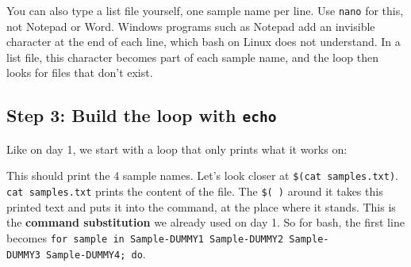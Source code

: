 \documentclass[
  letterpaper,
  DIV=11,
  numbers=noendperiod]{scrreprt}
\newenvironment{Shaded}{}{}
\newcommand{\BuiltInTok}[1]{\textcolor[rgb]{0.84,0.23,0.29}{#1}}
\newcommand{\ControlFlowTok}[1]{\textcolor[rgb]{0.84,0.23,0.29}{#1}}
\newcommand{\FunctionTok}[1]{\textcolor[rgb]{0.44,0.26,0.76}{#1}}
\newcommand{\KeywordTok}[1]{\textcolor[rgb]{0.84,0.23,0.29}{#1}}
\newcommand{\NormalTok}[1]{\textcolor[rgb]{0.14,0.16,0.18}{#1}}
\newcommand{\VariableTok}[1]{\textcolor[rgb]{0.89,0.38,0.04}{#1}}
\begin{document}
\begin{tcolorbox}[enhanced jigsaw, colbacktitle=quarto-callout-tip-color!10!white, rightrule=.15mm, leftrule=.75mm, colback=white, opacitybacktitle=0.6, title=\textcolor{quarto-callout-tip-color}{\faLightbulb}\hspace{0.5em}{Tip: Making a list file by hand (optional)}, bottomrule=.15mm, left=2mm, colframe=quarto-callout-tip-color-frame, opacityback=0, breakable, bottomtitle=1mm, coltitle=black, arc=.35mm, toprule=.15mm, toptitle=1mm, titlerule=0mm]

You can also type a list file yourself, one sample name per line. Use
\texttt{nano} for this, not Notepad or Word. Windows programs such as
Notepad add an invisible character at the end of each line, which bash
on Linux does not understand. In a list file, this character becomes
part of each sample name, and the loop then looks for files that don't
exist.

\end{tcolorbox}

\subsection{\texorpdfstring{Step 3: Build the loop with
\texttt{echo}}{Step 3: Build the loop with echo}}\label{step-3-build-the-loop-with-echo}

Like on day 1, we start with a loop that only prints what it works on:

\begin{Shaded}
\end{Shaded}

This should print the 4 sample names. Let's look closer at
\texttt{\$(cat\ samples.txt)}. \texttt{cat\ samples.txt} prints the
content of the file. The \texttt{\$(\ )} around it takes this printed
text and puts it into the command, at the place where it stands. This is
the \textbf{command substitution} we already used on day 1. So for bash,
the first line becomes
\texttt{for\ sample\ in\ Sample-DUMMY1\ Sample-DUMMY2\ Sample-DUMMY3\ Sample-DUMMY4;\ do}.
\end{document}

